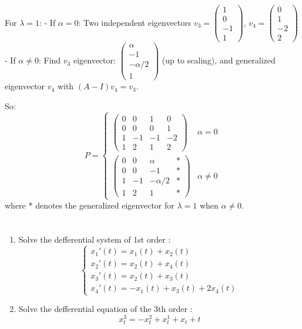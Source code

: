 \documentclass[12pt]{article}
\begin{document}
\begin{correctionbox}
For $\lambda = 1$:
- If $\alpha = 0$: Two independent eigenvectors $v_3 = \begin{pmatrix} 1 \\ 0 \\ -1 \\ 1 \end{pmatrix}$, $v_4 = \begin{pmatrix} 0 \\ 1 \\ -2 \\ 2 \end{pmatrix}$
- If $\alpha \neq 0$: Find $v_3$ eigenvector: $\begin{pmatrix} \alpha \\ -1 \\ -\alpha/2 \\ 1 \end{pmatrix}$ (up to scaling), and generalized eigenvector $v_4$ with $(A-I)v_4 = v_3$.

So:
\[
P = \begin{cases}
\begin{pmatrix} 0 & 0 & 1 & 0 \\ 0 & 0 & 0 & 1 \\ 1 & -1 & -1 & -2 \\ 1 & 2 & 1 & 2 \end{pmatrix} & \alpha = 0 \\
\begin{pmatrix} 0 & 0 & \alpha & * \\ 0 & 0 & -1 & * \\ 1 & -1 & -\alpha/2 & * \\ 1 & 2 & 1 & * \end{pmatrix} & \alpha \neq 0
\end{cases}
\]
where * denotes the generalized eigenvector for $\lambda=1$ when $\alpha \neq 0$.
\end{correctionbox}

\section{}
\begin{enumerate}
  \item Solve the defferential system of 1st order : $$\begin{cases}
    x_1'(t)= x_1(t) + x_2(t) \\
    x_2'(t) = x_2(t) + x_4(t) \\
    x_3'(t) = x_2(t) + x_3(t) \\
    x_4'(t) = - x_1(t) + x_3(t) + 2x_4(t)
  \end{cases}$$ 
  
  \item Solve the defferential equation of the 3th order : $$x^3_t = - x^2_t + x^1_t + x_t + t$$
\end{enumerate}
\end{document}
